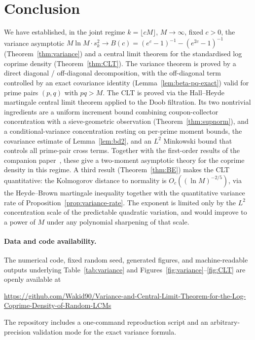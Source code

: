 \documentclass[11pt]{article}
\theoremstyle{remark}
\begin{document}
\section{Conclusion}\label{sec:conclusion}

We have established, in the joint regime $k = \lfloor cM \rfloor$, $M \to \infty$, fixed $c > 0$, the variance asymptotic $M \ln M \cdot s_k^2 \to B(c) = (e^c - 1)^{-1} - (e^{2c} - 1)^{-1}$ (Theorem~\ref{thm:variance}) and a central limit theorem for the standardised log coprime density (Theorem~\ref{thm:CLT}). The variance theorem is proved by a direct diagonal / off-diagonal decomposition, with the off-diagonal term controlled by an exact covariance identity (Lemma~\ref{lem:beta-pq-exact}) valid for prime pairs $(p, q)$ with $pq > M$. The CLT is proved via the Hall--Heyde martingale central limit theorem applied to the Doob filtration. Its two nontrivial ingredients are a uniform increment bound combining coupon-collector concentration with a sieve-geometric observation (Theorem~\ref{thm:supnorm}), and a conditional-variance concentration resting on per-prime moment bounds, the covariance estimate of Lemma~\ref{lem:bd2}, and an $L^2$ Minkowski bound that controls all prime-pair cross terms. Together with the first-order results of the companion paper~\cite{wakid1}, these give a two-moment asymptotic theory for the coprime density in this regime. A third result (Theorem~\ref{thm:BE}) makes the CLT quantitative: the Kolmogorov distance to normality is $O_c((\ln M)^{-2/5})$, via the Heyde--Brown martingale inequality together with the quantitative variance rate of Proposition~\ref{prop:variance-rate}. The exponent is limited only by the $L^2$ concentration scale of the predictable quadratic variation, and would improve to a power of $M$ under any polynomial sharpening of that scale.

\paragraph{Data and code availability.}
The numerical code, fixed random seed, generated figures, and machine-readable outputs underlying Table~\ref{tab:variance} and Figures~\ref{fig:variance}--\ref{fig:CLT} are openly available at
\begin{center}
\url{https://github.com/Wakid90/Variance-and-Central-Limit-Theorem-for-the-Log-Coprime-Density-of-Random-LCMs}
\end{center}
The repository includes a one-command reproduction script and an arbitrary-precision validation mode for the exact variance formula.
\end{document}
